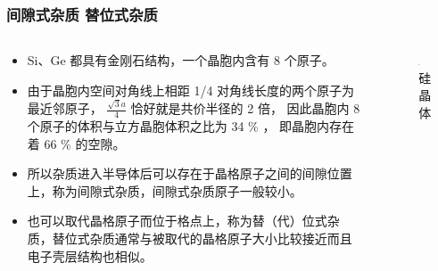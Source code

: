 \documentclass[xcolor=table,dvipsnames,svgnames,aspectratio=169]{ctexbeamer}
\begin{document}

\begin{frame}
  \frametitle{间隙式杂质 \space 替位式杂质}

  \begin{columns}
    \begin{column}{0.7\textwidth}
      \begin{itemize}
        \item Si、Ge 都具有金刚石结构，一个晶胞内含有 8 个原子。
        \item 由于晶胞内空间对角线上相距 1/4 对角线长度的两个原子为最近邻原子， $\frac{\sqrt{3}a}{4}$ 恰好就是共价半径的 2 倍， 因此晶胞内 8 个原子的体积与立方晶胞体积之比为 34 \% ， 即晶胞内存在着 66 \% 的空隙。
        \item 所以杂质进入半导体后可以存在于晶格原子之间的间隙位置上，称为间隙式杂质，间隙式杂质原子一般较小。
        \item 也可以取代晶格原子而位于格点上，称为替（代）位式杂质，替位式杂质通常与被取代的晶格原子大小比较接近而且电子壳层结构也相似。
      \end{itemize}
    \end{column}
    \begin{column}{0.3\textwidth}
      \begin{figure}
        \centering
        \includegraphics[width=0.8\textwidth]{硅晶体.png}
        \caption{硅晶体}
      \end{figure}
    \end{column}
  \end{columns}

\end{frame}
\end{document}
